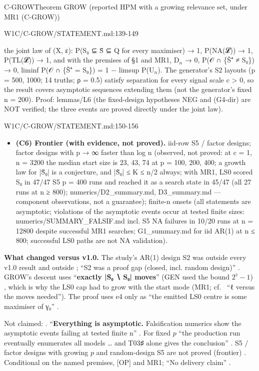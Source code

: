 \begin{card}{C-GROW}{Theorem GROW (reported HPM with a growing relevance set, under MR1 (C-GROW))}
\begin{stmt}{W1C/C-GROW/STATEMENT.md:139-149}
\begin{itemize}
the joint law of (X, ε): P(S₀ ⊆ S̃ ⊆ Q for every maximiser) → 1, P(NA(𝓛)) → 1, P(TL(𝓛)) → 1, and with the
premises of §1 and MR1, D$_{n}$ → 0, P(𝒪 ∩ \{Ŝ⁺ ≠ S₀\}) → 0, liminf P(𝒪 ∩ \{Ŝ⁺ = S₀\}) = 1 − limsup P(U$_{n}$). The
generator's S2 layouts (p = 500, 1000; 14 truths; ρ = 0.5) satisfy separation for every signal scale c > 0, so the
result covers asymptotic sequences extending them (not the generator's fixed n = 200). Proof: lemmas/L6 (the
fixed-design hypotheses NEG and (G4-dir) are NOT verified; the three events are proved directly under the joint
law).
\end{itemize}
\end{stmt}
\begin{stmt}{W1C/C-GROW/STATEMENT.md:150-156}
\begin{itemize}
\item \textbf{(C6) Frontier (with evidence, not proved).} iid-row S5 / factor designs; factor designs with p → ∞ faster than
log n (observed, not proved: at c = 1, n = 3200 the median start size is 23, 43, 74 at p = 100, 200, 400; a growth
law for |S̃₀| is a conjecture, and |S̃₀| ≤ K ≤ n/2 always; with MR1, LS0 scored S₀ in 47/47 S5 p = 400 runs and
reached it as a search state in 45/47 (all 27 runs at n ≥ 800); numerics/D2\_summary.md, D3\_summary.md — component
observations, not a guarantee); finite-n onsets (all statements are asymptotic; violations of the asymptotic events
occur at tested finite sizes: numerics/SUMMARY\_FALSIF.md incl. S5 NA failures in 10/20 runs at n = 12800 despite
successful MR1 searches; G1\_summary.md for iid AR(1) at n ≤ 800; successful LS0 paths are not NA validation).
\end{itemize}
\end{stmt}

\textbf{What changed versus v1.0.} The study's AR(1) design S2 was outside every v1.0 result and outside ; ``S2 was a proof gap (closed, incl. random design)'' . GROW's descent uses ``\textbf{exactly |S̃₀ ∖ S₀| moves}'' (GEN used the bound $2^{\bar v}-1$) , which is why the LS0 cap had to grow with the start mode (MR1; cf.\  ``ℓ versus the moves needed''). The proof uses e4 only as ``the emitted LS0 centre is some maximiser of γ₀'' .

\begin{notproved}
Not claimed: . ``\textbf{Everything is asymptotic.} Falsification numerics show the asymptotic events failing at tested finite n'' . For fixed $p$ ``the production run eventually enumerates all models \ldots{} and T03♯ alone gives the conclusion'' . S5 / factor designs with growing $p$ and random-design S5 are not proved (frontier) . Conditional on the named premises, [OP] and MR1; ``No delivery claim'' .
\end{notproved}
\end{card}

